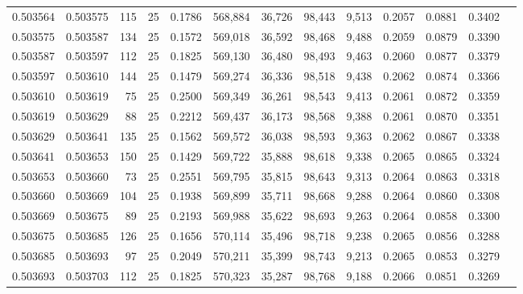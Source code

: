 \begin{tabular}{rrrrrrrrrrrrr}
0.503564 & 0.503575 & 115 &  25 &                                     0.1786 & 568,884 &  36,726 &  98,443 &   9,513 & 0.2057 & 0.0881 & 0.3402 \\
0.503575 & 0.503587 & 134 &  25 &                                     0.1572 & 569,018 &  36,592 &  98,468 &   9,488 & 0.2059 & 0.0879 & 0.3390 \\
0.503587 & 0.503597 & 112 &  25 &                                     0.1825 & 569,130 &  36,480 &  98,493 &   9,463 & 0.2060 & 0.0877 & 0.3379 \\
0.503597 & 0.503610 & 144 &  25 &                                     0.1479 & 569,274 &  36,336 &  98,518 &   9,438 & 0.2062 & 0.0874 & 0.3366 \\
0.503610 & 0.503619 &  75 &  25 &                                     0.2500 & 569,349 &  36,261 &  98,543 &   9,413 & 0.2061 & 0.0872 & 0.3359 \\
0.503619 & 0.503629 &  88 &  25 &                                     0.2212 & 569,437 &  36,173 &  98,568 &   9,388 & 0.2061 & 0.0870 & 0.3351 \\
0.503629 & 0.503641 & 135 &  25 &                                     0.1562 & 569,572 &  36,038 &  98,593 &   9,363 & 0.2062 & 0.0867 & 0.3338 \\
0.503641 & 0.503653 & 150 &  25 &                                     0.1429 & 569,722 &  35,888 &  98,618 &   9,338 & 0.2065 & 0.0865 & 0.3324 \\
0.503653 & 0.503660 &  73 &  25 &                                     0.2551 & 569,795 &  35,815 &  98,643 &   9,313 & 0.2064 & 0.0863 & 0.3318 \\
0.503660 & 0.503669 & 104 &  25 &                                     0.1938 & 569,899 &  35,711 &  98,668 &   9,288 & 0.2064 & 0.0860 & 0.3308 \\
0.503669 & 0.503675 &  89 &  25 &                                     0.2193 & 569,988 &  35,622 &  98,693 &   9,263 & 0.2064 & 0.0858 & 0.3300 \\
0.503675 & 0.503685 & 126 &  25 &                                     0.1656 & 570,114 &  35,496 &  98,718 &   9,238 & 0.2065 & 0.0856 & 0.3288 \\
0.503685 & 0.503693 &  97 &  25 &                                     0.2049 & 570,211 &  35,399 &  98,743 &   9,213 & 0.2065 & 0.0853 & 0.3279 \\
0.503693 & 0.503703 & 112 &  25 &                                     0.1825 & 570,323 &  35,287 &  98,768 &   9,188 & 0.2066 & 0.0851 & 0.3269 \\

\end{tabular}
